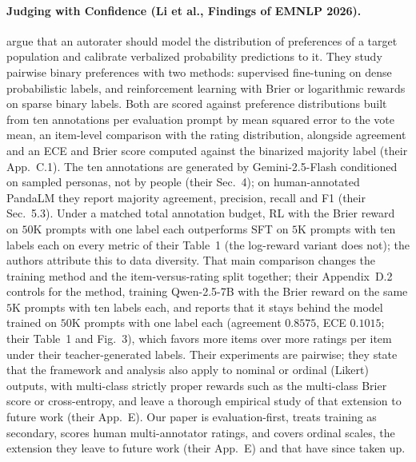\paragraph{Judging with Confidence (Li et al., Findings of EMNLP 2026).}
\citet{li2026judging} argue that an autorater should model the distribution of preferences of a target population and calibrate verbalized probability predictions to it.
They study pairwise binary preferences with two methods: supervised fine-tuning on dense probabilistic labels, and reinforcement learning with Brier or logarithmic rewards on sparse binary labels.
Both are scored against preference distributions built from ten annotations per evaluation prompt by mean squared error to the vote mean, an item-level comparison with the rating distribution, alongside agreement and an ECE and Brier score computed against the binarized majority label (their App.~C.1). The ten annotations are generated by Gemini-2.5-Flash conditioned on sampled personas, not by people (their Sec.~4); on human-annotated PandaLM they report majority agreement, precision, recall and F1 (their Sec.~5.3).
Under a matched total annotation budget, RL with the Brier reward on $50$K prompts with one label each outperforms SFT on $5$K prompts with ten labels each on every metric of their Table~1 (the log-reward variant does not); the authors attribute this to data diversity.
That main comparison changes the training method and the item-versus-rating split together; their Appendix~D.2 controls for the method, training Qwen-2.5-7B with the Brier reward on the same $5$K prompts with ten labels each, and reports that it stays behind the model trained on $50$K prompts with one label each (agreement $0.8575$, ECE $0.1015$; their Table~1 and Fig.~3), which favors more items over more ratings per item under their teacher-generated labels.
Their experiments are pairwise; they state that the framework and analysis also apply to nominal or ordinal (Likert) outputs, with multi-class strictly proper rewards such as the multi-class Brier score or cross-entropy, and leave a thorough empirical study of that extension to future work (their App.~E).
Our paper is evaluation-first, treats training as secondary, scores human multi-annotator ratings, and covers ordinal scales, the extension they leave to future work (their App.~E) and that \citet{lyu2026humanresidual} have since taken up.

